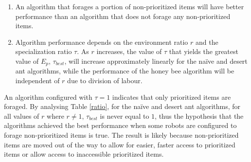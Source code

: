 \begin{enumerate}
\item An algorithm that forages a portion of non-prioritized items will have better performance than an algorithm that does not forage any non-prioritized items.
\item Algorithm performance depends on the environment ratio $r$ and the specialization ratio $\tau$. As $r$ increases, the value of $\tau$ that yields the greatest value of $E_p$, $\tau_{best}$, will increase approximately linearly for the na\"ive and desert ant algorithms, while the performance of the honey bee algorithm will be independent of $r$ due to division of labour.
\end{enumerate}

An algorithm configured with $\tau=1$ indicates that only prioritized items are foraged. By analysing Table \ref{ratio}, for the na\"ive and desert ant algorithms, for all values of $r$ where $r \neq 1$, $\tau_{best}$ is never equal to $1$, thus the hypothesis that the algorithms achieved the best performance when some robots are configured to forage non-prioritized items is true. The result is likely because non-prioritized items are moved out of the way to allow for easier, faster access to prioritized items or allow access to inaccessible prioritized items.


